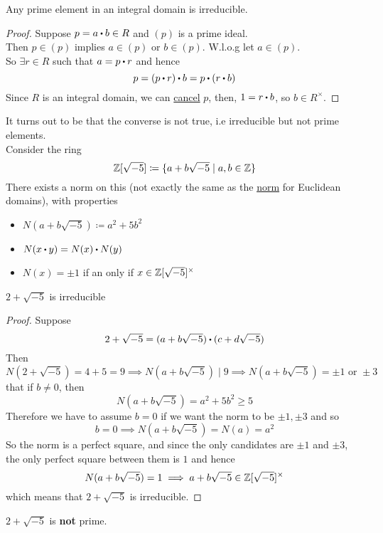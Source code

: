 \documentclass[../Main.tex]{subfiles}
\begin{document}
\begin{prop}[title = Prime elements in integral domain are irreducible,label=11.2]
	Any prime element in an integral domain is irreducible.
\end{prop}
\begin{proof}
	Suppose $p=a\rdot b\in R$ and $(p)$ is a prime ideal.\\
	Then $p\in (p)$ implies $a\in (p)$ or $b\in (p)$. W.l.o.g let $a\in (p)$.\\
	So $\exists r\in R$ such that $a=p\rdot r$ and hence
	\[p=(p\rdot r)\rdot b=p\rdot (r\rdot b)\]
	Since $R$ is an integral domain, we can \hyperref[prop:cancel]{cancel} $p$, then, $1=r\rdot b$, so $b\in R^\times $.
\end{proof}
\begin{example}
	It turns out to be that the converse is not true, i.e irreducible but not prime elements.\\
	Consider the ring 
	\[\mathbb{Z}[\sqrt{-5}] \coloneq \{a+b\sqrt{-5}\mid a,b\in \mathbb{Z}\} \]
	There exists a norm on this (not exactly the same as the \hyperref[dfn:norm]{norm} for Euclidean domains), with properties
	\begin{itemize}
		\item $N(a+b\sqrt{-5}) \coloneqq a^2+5b^2$
		\item $N(x\rdot y)=N(x)\rdot N(y)$
		\item $N(x)=\pm 1$ if an only if $x\in \mathbb{Z}[\sqrt{-5}]^\times$
	\end{itemize}
\end{example}
\begin{claim}
	$2+\sqrt{-5}$ is irreducible
\end{claim}
\begin{proof}
	Suppose 
	\[2+\sqrt{-5}=(a+b\sqrt{-5})\rdot (c+d\sqrt{-5})\]
	Then
	\[N(2+\sqrt{-5}) = 4+5 =9 \implies N(a+b\sqrt{-5})\mid 9 \implies N(a+b\sqrt{-5}) = \pm 1 \text{ or } \pm 3\]
	\Obs that if $b\ne 0$, then \[N(a+b\sqrt{-5}) = a^2+5b^2\ge 5\]
	Therefore we have to assume $b=0$ if we want the norm to be $\pm 1, \pm 3$ and so
	\[b=0\implies N(a+b\sqrt{-5})=N(a)=a^2\]
	So the norm is a perfect square, and since the only candidates are $\pm 1$ and $\pm 3$, the only perfect square between them is $1$ and hence
	\[N(a+b\sqrt{-5})=1 \implies a+b\sqrt{-5}\in \mathbb{Z}[\sqrt{-5}]^\times\]
	which means that $2+\sqrt{-5}$ is irreducible.
\end{proof}
\begin{claim}
	$2+\sqrt{-5}$ is \textbf{not} prime.
\end{claim}
\end{document}
